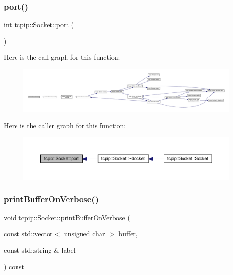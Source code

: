 \subsubsection{\texorpdfstring{port()}{port()}}
{\footnotesize\ttfamily int tcpip\+::\+Socket\+::port (\begin{DoxyParamCaption}{ }\end{DoxyParamCaption})}

Here is the call graph for this function\+:
\nopagebreak
\begin{figure}[H]
\begin{center}
\leavevmode
\includegraphics[width=350pt]{classtcpip_1_1_socket_ab7e67c84c32557ffb98d940081497d67_cgraph}
\end{center}
\end{figure}
Here is the caller graph for this function\+:
\nopagebreak
\begin{figure}[H]
\begin{center}
\leavevmode
\includegraphics[width=350pt]{classtcpip_1_1_socket_ab7e67c84c32557ffb98d940081497d67_icgraph}
\end{center}
\end{figure}
\mbox{\label{classtcpip_1_1_socket_a08e08cdc00fd69a51e2cdd8ecb22d1e0}} 
\subsubsection{\texorpdfstring{print\+Buffer\+On\+Verbose()}{printBufferOnVerbose()}}
{\footnotesize\ttfamily void tcpip\+::\+Socket\+::print\+Buffer\+On\+Verbose (\begin{DoxyParamCaption}\item[{const std\+::vector$<$ unsigned char $>$}]{buffer,  }\item[{const std\+::string \&}]{label }\end{DoxyParamCaption}) const\hspace{0.3cm}{\ttfamily [protected]}}



